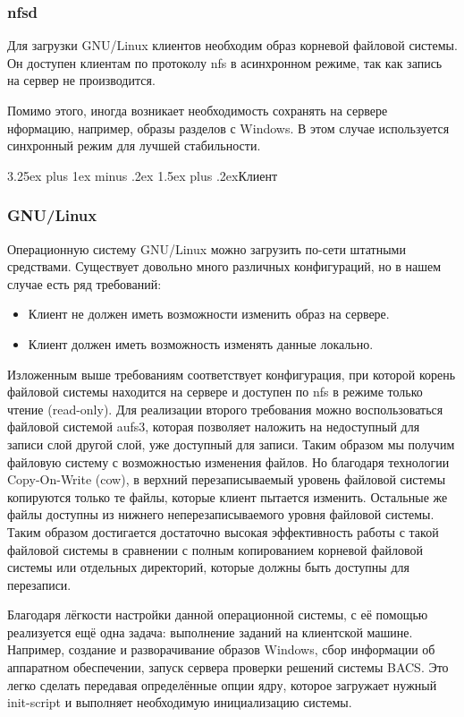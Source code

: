 \documentclass[11pt]{article}
\makeatletter
\renewcommand{\subsection}{\@startsection{subsection}{2}%
{\parindent}{3.25ex plus 1ex minus .2ex}%
{1.5ex plus .2ex}{\bfseries}}
\makeatother
\begin{document}
\subsubsection{nfsd}
Для загрузки GNU/Linux клиентов необходим образ
корневой файловой системы. Он доступен клиентам
по протоколу nfs в асинхронном режиме, так как
запись на сервер не производится.

Помимо этого, иногда возникает необходимость
сохранять на сервере нформацию, например, образы
разделов с Windows. В этом случае используется
синхронный режим для лучшей стабильности.

\subsection{Клиент}

\subsubsection{GNU/Linux}
Операционную систему GNU/Linux можно загрузить по-сети
штатными средствами. Существует довольно много различных
конфигураций, но в нашем случае есть ряд требований:
\begin{itemize}
    \item Клиент не должен иметь возможности изменить образ на сервере.
    \item Клиент должен иметь возможность изменять данные локально.
\end{itemize}

Изложенным выше требованиям соответствует конфигурация, при которой
корень файловой системы находится на сервере и доступен по nfs
в режиме только чтение (read-only). Для реализации второго требования
можно воспользоваться файловой системой aufs3, которая позволяет
наложить на недоступный для записи слой другой слой,
уже доступный для записи. Таким образом мы получим файловую систему
с возможностью изменения файлов. Но благодаря технологии Copy-On-Write (cow),
в верхний перезаписываемый уровень файловой системы копируются только те файлы,
которые клиент пытается изменить. Остальные же файлы доступны из нижнего
неперезаписываемого уровня файловой системы. Таким образом достигается
достаточно высокая эффективность работы с такой файловой системы в сравнении
с полным копированием корневой файловой системы или отдельных директорий,
которые должны быть доступны для перезаписи.

Благодаря лёгкости настройки данной операционной системы, с её помощью реализуется
ещё одна задача: выполнение заданий на клиентской машине. Например,
создание и разворачивание образов Windows, сбор информации об аппаратном
обеспечении, запуск сервера проверки решений системы BACS. Это легко сделать
передавая определённые опции ядру, которое загружает нужный init-script
и выполняет необходимую инициализацию системы.
\end{document}
